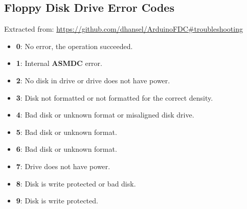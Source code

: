 \documentclass[a4paper,11pt]{article}
\begin{document}
    \subsection{Floppy Disk Drive Error Codes}

    Extracted from: \url{https://github.com/dhansel/ArduinoFDC#troubleshooting}

    \begin{itemize}
        \item \textbf{0}: No error, the operation succeeded.
        \item \textbf{1}: Internal \textbf{ASMDC} error.
        \item \textbf{2}: No disk in drive or drive does not have power.
        \item \textbf{3}: Disk not formatted or not formatted for the correct
        density.
        \item \textbf{4}: Bad disk or unknown format or misaligned disk drive.
        \item \textbf{5}: Bad disk or unknown format.
        \item \textbf{6}: Bad disk or unknown format.
        \item \textbf{7}: Drive does not have power.
        \item \textbf{8}: Disk is write protected or bad disk.
        \item \textbf{9}: Disk is write protected.
    \end{itemize}

    \pagebreak
    
    
\end{document}
